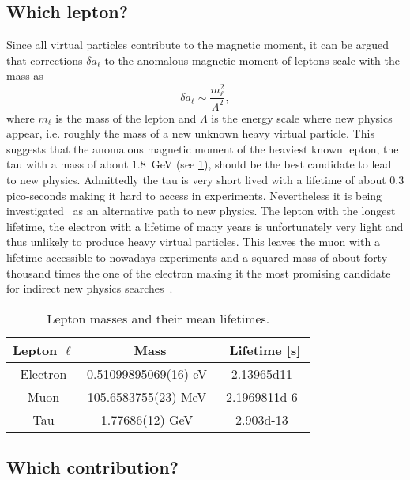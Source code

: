 \subsection{Which lepton?}

Since all virtual particles contribute to the magnetic moment, it can be argued~\cite{osti_4382322} that corrections $\delta a_{\ell}$ to the anomalous magnetic moment of leptons scale with the mass as
\begin{equation}
\delta a_{\ell} \sim \frac{m_{\ell}^{2}}{\Lambda^{2}},
\end{equation}
where $m_{\ell}$ is the mass of the lepton and $\Lambda$ is the energy scale where new physics appear, i.e. roughly the mass of a new unknown heavy virtual particle.
This suggests that the anomalous magnetic moment of the heaviest known lepton, the tau with a mass of about \SI{1.8}{\GeV} (see \cref{tab:leptons}), should be the best candidate to lead to new physics.
Admittedly the tau is very short lived with a lifetime of about \num{0.3} pico-seconds making it hard to access in experiments.
Nevertheless it is being investigated~\cite{Fael:2013ij,BaBar:2015ard} as an alternative path to new physics.
The lepton with the longest lifetime, the electron with a lifetime of many years is unfortunately very light and thus unlikely to produce heavy virtual particles.
This leaves the muon with a lifetime accessible to nowadays experiments and a squared mass of about forty thousand times the one of the electron making it the most promising candidate for indirect new physics searches~\cite{jegerlehner2009muon}.

\begin{table}
\begin{tabular}{ccc}
\toprule
Lepton $\ell$ & Mass & Lifetime [s] \\
\midrule
Electron &
0.51099895069(16) eV~\cite{codata:2022} &
\num{2.13965d11}~\cite{PhysRevLett.115.231802} \\
\midrule
Muon &
105.6583755(23) MeV~\cite{codata:2022} &
\num{2.1969811d-6}~\cite{beringer2012pdg,Patrignani_2016} \\
\midrule
Tau &
1.77686(12) GeV~\cite{codata:2022,PhysRevD.98.030001} &
\num{2.903d-13}~\cite{PhysRevD.98.030001} \\
\bottomrule
\end{tabular}
\caption{\label{tab:leptons}
Lepton masses and their mean lifetimes.}
\end{table}

\subsection{Which contribution?}

